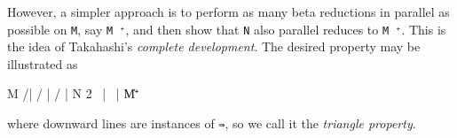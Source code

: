 However, a simpler approach is to perform as many beta reductions in
parallel as possible on \texttt{M}, say \texttt{M\ ⁺}, and then show
that \texttt{N} also parallel reduces to \texttt{M\ ⁺}. This is the idea
of Takahashi's \emph{complete development}. The desired property may be
illustrated as

\begin{myDisplay}
    M
   /|
  / |
 /  |
N   2
 \  |
  \ |
   \|
    M⁺
\end{myDisplay}

where downward lines are instances of \texttt{⇛}, so we call it the
\emph{triangle property}.

\begin{fence}
\begin{code}%
\>[0]\AgdaSpace{}%
\AgdaSymbol{:}\AgdaSpace{}%
\AgdaSpace{}%
\AgdaSymbol{\{}\AgdaSpace{}%
\AgdaSymbol{\}}\<%
\\
\>[0][@{}l@{\AgdaIndent{0}}]%
\>[2]\AgdaSpace{}%
\AgdaSpace{}%
\AgdaSpace{}%
\AgdaSpace{}%
\AgdaSpace{}%
\AgdaSpace{}%
\AgdaSpace{}%
\<%
\\
\>[0]\AgdaSymbol{(}\AgdaSpace{}%
\AgdaSymbol{)}\AgdaSpace{}%
%
\>[14]\AgdaSymbol{=}%
\>[17]\AgdaSpace{}%
\<%
\\
\>[0]\AgdaSymbol{(}\AgdaSpace{}%
\AgdaSymbol{)}\AgdaSpace{}%
%
\>[14]\AgdaSymbol{=}\AgdaSpace{}%
\AgdaSpace{}%
\AgdaSymbol{(}\AgdaSpace{}%
\AgdaSymbol{)}\<%
\\
\>[0]\AgdaSymbol{((}\AgdaSpace{}%
\AgdaSymbol{)}\AgdaSpace{}%
\AgdaSpace{}%
\AgdaSymbol{)}\AgdaSpace{}%
\AgdaSpace{}%
\AgdaSymbol{=}\AgdaSpace{}%
\AgdaSpace{}%
\AgdaSpace{}%
\AgdaOperator{\AgdaFunction{[}}\AgdaSpace{}%
\AgdaSpace{}%
\AgdaSpace{}%
\AgdaOperator{\AgdaFunction{]}}\<%
\\
\>[0]\AgdaCatchallClause{\AgdaSymbol{(}}\AgdaSpace{}%

\end{code}
\end{fence}
